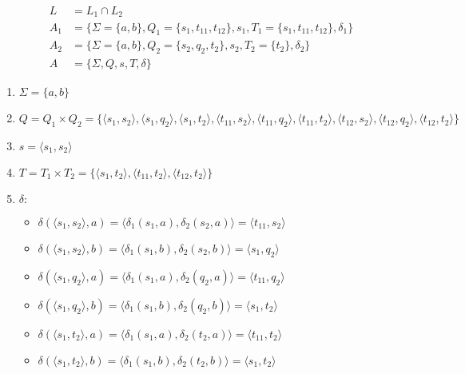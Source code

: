 \documentclass[a4paper, 12pt]{article}
\begin{document}
\newpage

\[
\begin{aligned}
L &= L_1 \cap L_2 \\
A_1 &= \{ \Sigma = \{a, b\}, Q_1 = \{ s_1, t_{11}, t_{12} \}, s_1, T_1 = \{ s_1, t_{11}, t_{12} \}, \delta_1  \} \\
A_2 &= \{ \Sigma = \{a, b\}, Q_2 = \{ s_2, q_2, t_2 \}, s_2, T_2 = \{ t_2 \}, \delta_2  \} \\
A &= \{ \Sigma, Q, s, T, \delta \}
\end{aligned}
\]


\begin{enumerate}
    \item $ \Sigma = \{ a, b \} $
    \item $ Q = Q_1 \times Q_2 = \{ \langle s_1, s_2 \rangle, \langle s_1, q_2 \rangle, \langle s_1, t_2 \rangle, \langle t_{11}, s_2 \rangle, \langle t_{11}, q_2 \rangle, \langle t_{11}, t_2 \rangle, \langle t_{12}, s_2 \rangle, \langle t_{12}, q_2 \rangle, \langle t_{12}, t_2 \rangle \} $
    \item $ s = \langle s_1, s_2 \rangle $
    \item $ T = T_1 \times T_2 = \{ \langle s_1, t_2 \rangle, \langle t_{11}, t_2 \rangle, \langle t_{12}, t_2 \rangle \}$
    \item $ \delta : $
    \begin{itemize}
        \item $ \delta (\langle s_1, s_2 \rangle, a) = \langle \delta_1 (s_1, a), \delta_2 (s_2, a) \rangle = \langle t_{11}, s_2 \rangle $
        \item $ \delta (\langle s_1, s_2 \rangle, b) = \langle \delta_1 (s_1, b), \delta_2 (s_2, b) \rangle = \langle s_1, q_2 \rangle $
        \item $ \delta (\langle s_1, q_2 \rangle, a) = \langle \delta_1 (s_1, a), \delta_2 (q_2, a) \rangle = \langle t_{11}, q_2 \rangle $
        \item $ \delta (\langle s_1, q_2 \rangle, b) = \langle \delta_1 (s_1, b), \delta_2 (q_2, b) \rangle = \langle s_1, t_2 \rangle $
        \item $ \delta (\langle s_1, t_2 \rangle, a) = \langle \delta_1 (s_1, a), \delta_2 (t_2, a) \rangle = \langle t_{11}, t_2 \rangle $
        \item $ \delta (\langle s_1, t_2 \rangle, b) = \langle \delta_1 (s_1, b), \delta_2 (t_2, b) \rangle = \langle s_1, t_2 \rangle $
        

\end{itemize}
\end{enumerate}
\end{document}
